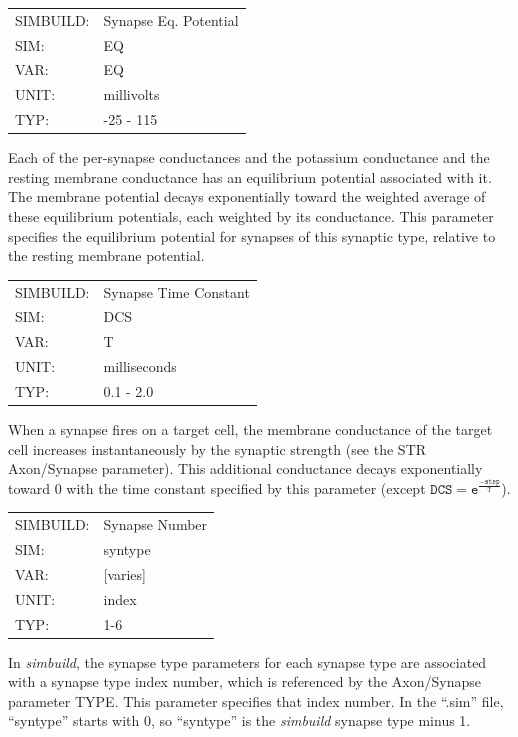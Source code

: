 \documentclass[12pt,openany,oneside]{book}
\newcommand{\tmcode}[1]{\mathtt{#1}}
\newcommand{\prog}[1]{\textit{{#1}}}
\newcommand{\ext}[1]{{{``.#1''}}}
\newcommand{\inquotes}[1]{{{``#1''}}}
\begin{document}
\begin{flushleft}
\begin{tabular}{@{}ll@{}}
SIMBUILD: & Synapse Eq. Potential\\
SIM: & EQ\\
VAR: & EQ\\
UNIT: & millivolts\\
TYP: & -25 - 115\\
\end{tabular}
\end{flushleft}
\noindent
Each of the per-synapse conductances and the potassium conductance and
the resting membrane conductance has an equilibrium potential
associated with it. The membrane potential decays exponentially
toward the weighted average of these equilibrium potentials, each
weighted by its conductance. This parameter specifies the equilibrium
potential for synapses of this synaptic type, relative to the resting
membrane potential.
\filbreak
\vspace{\baselineskip}

\begin{flushleft}
\begin{tabular}{@{}ll@{}}
SIMBUILD: & Synapse Time Constant\\
SIM: & DCS\\
VAR: & T\\
UNIT: & milliseconds\\
TYP: & 0.1 - 2.0\\
\end{tabular}
\end{flushleft}
\noindent
When a synapse fires on a target cell, the membrane conductance of the
target cell increases instantaneously by the synaptic strength (see
the STR Axon/Synapse parameter). This additional conductance decays
exponentially toward 0 with the time constant specified by this
parameter (except $\tmcode{DCS = e^{\tfrac{-step}{T}}}$).
\filbreak
\vspace{\baselineskip}

\begin{flushleft}
\begin{tabular}{@{}ll@{}}
SIMBUILD: & Synapse Number\\
SIM: & syntype\\
VAR: & [varies]\\
UNIT: & index\\
TYP: & 1-6\\
\end{tabular}
\end{flushleft}
\noindent
In \prog{simbuild}, the synapse type parameters for each synapse type are
associated with a synapse type index number, which is referenced by
the Axon/Synapse parameter TYPE. This parameter specifies that index
number. In the \ext{sim} file, \inquotes{syntype} starts with 0, so
\inquotes{syntype} is the
\prog{simbuild} synapse type minus 1.
\filbreak
\vspace{\baselineskip}
\end{document}
